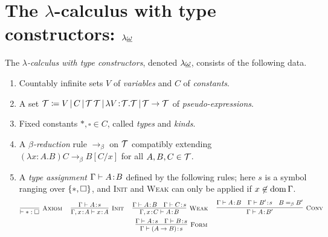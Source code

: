 \documentclass[reqno]{amsart}
\begin{document}
    \section{The $\lambda$-calculus with type constructors: $\lambda\uline{\omega}$}

    \begin{definition}
        The \textit{$\lambda$-calculus with type constructors}, denoted $\lambda\uline{\omega}$, consists of the following data.
        \begin{enumerate}
            \item Countably infinite sets $V$ of \textit{variables} and $C$ of \textit{constants}.
            \item A set $\mathcal{T}\coloneqq V\,|\,C\,|\,\mathcal{T}\,\mathcal{T}\,|\,\lambda V\!:\!\mathcal{T}.\mathcal{T}\,|\,\mathcal{T}\rightarrow\mathcal{T}$ of \textit{pseudo-expressions}.
            \item Fixed constants $\ast,\square\in C$, called \textit{types} and \textit{kinds}.
            \item A \textit{$\beta$-reduction} rule $\rightarrow_\beta$ on $\mathcal{T}$ compatibly extending $(\lambda x\!:\!A.B)C\rightarrow_\beta B[C/x]$ for all $A,B,C\in\mathcal{T}$.
            \item A \textit{type assignment} $\Gamma\vdash A\!:\!B$ defined by the following rules; here $s$ is a symbol ranging over $\left\{\ast,\square\right\}$, and \textsc{Init} and \textsc{Weak} can only be applied if $x\not\in\operatorname{dom}\Gamma$.
                {\small\begin{equation*}
                    \begin{gathered}
                        \infer[\mathsc{Axiom}]{\proves\ast:\square}{}\ \ \ \ 
                        \infer[\mathsc{Init}]{\Gamma,x\!:\!A\proves x\!:\! A}{
                            \Gamma\proves A\!:\!s
                        }\ \ \ \ 
                        \infer[\mathsc{Weak}]{\Gamma,x\!:\!C\proves A\!:\! B}{
                            \Gamma\proves A\!:\!B &
                            \Gamma\proves C\!:\!s
                        }\ \ \ \ 
                        \infer[\mathsc{Conv}]{\Gamma\proves A\!:\!B'}{
                            \Gamma\proves A\!:\!B &
                            \Gamma\proves B'\!:\!s &
                            B=_\beta B'
                        } \\
                        \infer[\mathsc{Form}]{\Gamma\proves(A\rightarrow B)\!:\!s}{
                            \Gamma\proves A\!:\!s &
                            \Gamma\proves B\!:\!s
}
\end{gathered}
\end{equation*}}
\end{enumerate}
\end{definition}
\end{document}
